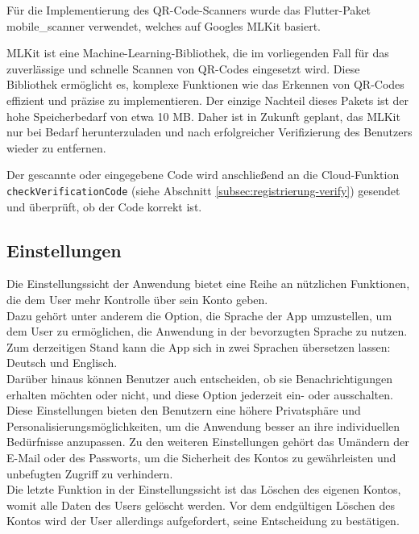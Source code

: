 Für die
Implementierung des QR-Code-Scanners wurde das Flutter-Paket
\cite{mobile_scanner} mobile\_scanner
verwendet, welches auf Googles MLKit \cite{googlemlkit}
basiert.

MLKit ist eine Machine-Learning-Bibliothek, die im
vorliegenden Fall für das zuverlässige und schnelle Scannen
von QR-Codes eingesetzt wird.
Diese Bibliothek ermöglicht es, komplexe Funktionen wie das Erkennen von QR-Codes effizient und präzise zu implementieren. Der einzige Nachteil dieses Pakets ist der hohe Speicherbedarf von etwa 10 MB. Daher ist in Zukunft geplant, das MLKit nur bei Bedarf herunterzuladen und nach erfolgreicher Verifizierung des Benutzers wieder zu entfernen.

Der gescannte oder eingegebene Code wird anschließend an die Cloud-Funktion
\\
\texttt{checkVerificationCode} (siehe Abschnitt \ref{subsec:registrierung-verify}) gesendet und überprüft, ob der Code korrekt ist.



\subsection{Einstellungen}
Die Einstellungssicht der Anwendung bietet eine Reihe an nützlichen Funktionen, die dem User mehr Kontrolle über sein Konto geben.
\\
Dazu gehört unter anderem die Option, die Sprache der App umzustellen, um dem User zu ermöglichen, die Anwendung in der bevorzugten Sprache zu nutzen. Zum derzeitigen Stand kann die App sich in zwei Sprachen übersetzen lassen: Deutsch und Englisch.
\\
Darüber hinaus können Benutzer auch entscheiden, ob sie Benachrichtigungen erhalten möchten oder nicht, und diese Option jederzeit ein- oder ausschalten. Diese Einstellungen bieten den Benutzern eine höhere Privatsphäre und Personalisierungsmöglichkeiten, um die Anwendung besser an ihre individuellen Bedürfnisse anzupassen.
Zu den weiteren Einstellungen gehört das Umändern der E-Mail oder des Passworts, um die Sicherheit des Kontos zu gewährleisten und unbefugten Zugriff zu verhindern.
\\
Die letzte Funktion in der Einstellungssicht ist das Löschen des eigenen Kontos, womit alle Daten des Users gelöscht werden. Vor dem endgültigen Löschen des Kontos wird der User allerdings aufgefordert, seine Entscheidung zu bestätigen.

